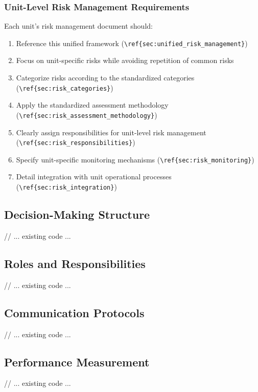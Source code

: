 \subsubsection{Unit-Level Risk Management Requirements} \label{sec:unit_risk_requirements}

Each unit's risk management document should:

\begin{enumerate}
    \item Reference this unified framework (\verb|\ref{sec:unified_risk_management}|)
    \item Focus on unit-specific risks while avoiding repetition of common risks
    \item Categorize risks according to the standardized categories (\verb|\ref{sec:risk_categories}|)
    \item Apply the standardized assessment methodology (\verb|\ref{sec:risk_assessment_methodology}|)
    \item Clearly assign responsibilities for unit-level risk management (\verb|\ref{sec:risk_responsibilities}|)
    \item Specify unit-specific monitoring mechanisms (\verb|\ref{sec:risk_monitoring}|)
    \item Detail integration with unit operational processes (\verb|\ref{sec:risk_integration}|)
\end{enumerate}

\subsection{Decision-Making Structure}
// ... existing code ...

\subsection{Roles and Responsibilities}
// ... existing code ...

\subsection{Communication Protocols}
// ... existing code ...

\subsection{Performance Measurement}
// ... existing code ...
